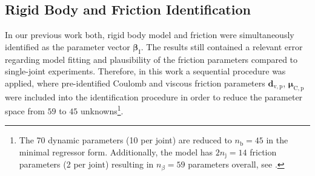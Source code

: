 \subsection{Rigid Body and Friction Identification}
\label{sec:advance_ident}
%

%
In our previous work \cite{SpVdTh14} both, rigid body model and friction were simultaneously identified as the parameter vector $\bm{\beta}_{\mathrm{I}}$.
The results still contained a relevant error regarding model fitting and plausibility of the friction parameters compared to single-joint experiments.
Therefore, in this work a sequential procedure was applied, where pre-identified Coulomb and viscous friction parameters $\bm{d}_\mathrm{v,p}$, $\bm{\mu}_\mathrm{C,p}$ were included into the identification procedure in order to reduce the parameter space from $59$ to $45$
unknowns\footnote{
The 70 dynamic parameters (10 per joint) are reduced to $n_\mathrm{b}=45$ in the minimal regressor form.
Additionally, the model has $2n_\mathrm{j}=14$ friction parameters (2 per joint) resulting in $n_\beta=59$ parameters overall, see \cite{SpVdTh14}.}.
